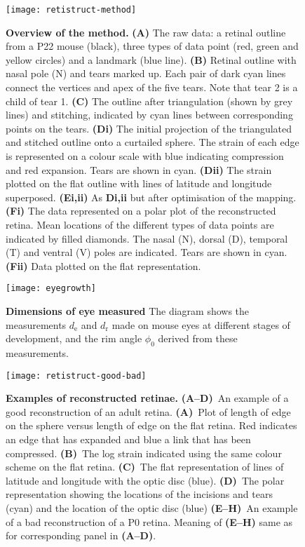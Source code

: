 \documentclass[10pt]{article}
\begin{document}
\begin{figure}[!ht]
  \texttt{[image: retistruct-method]}

  \caption{\textbf{Overview of the method.} \textbf{(A)} The raw data:
    a retinal outline from a P22 mouse (black), three types of data
    point (red, green and yellow circles) and a landmark (blue
    line). \textbf{(B)} Retinal outline with nasal pole (N) and tears
    marked up. Each pair of dark cyan lines connect the vertices and
    apex of the five tears. Note that tear 2 is a child of tear
    1. \textbf{(C)} The outline after triangulation (shown by grey
    lines) and stitching, indicated by cyan lines between
    corresponding points on the tears.  \textbf{(Di)} The initial
    projection of the triangulated and stitched outline onto a
    curtailed sphere. The strain of each edge is represented on a colour
    scale with blue indicating compression and red expansion. Tears
    are shown in cyan. \textbf{(Dii)} The strain plotted on the flat
    outline with lines of latitude and longitude
    superposed. \textbf{(Ei,ii)} As \textbf{Di,ii} but after
    optimisation of the mapping. \textbf{(Fi)} The data represented on
    a polar plot of the reconstructed retina. Mean locations of the
    different types of data points are indicated by filled
    diamonds. The nasal (N), dorsal (D), temporal (T) and ventral (V)
    poles are indicated. Tears are shown in cyan. \textbf{(Fii)} Data
    plotted on the flat representation.}
  \label{fold-sphere:fig:method}
\end{figure}
\begin{figure}[!ht]
  \centering
  \texttt{[image: eyegrowth]}
  \caption{\textbf{Dimensions of eye measured} The diagram shows the
    measurements $d_\mathrm{e}$ and $d_\mathrm{r}$ made on mouse eyes
    at different stages of development, and the rim angle $\phi_0$
    derived from these measurements.}
  \label{retistruct_plos:fig:eyegrowth}
\end{figure}
\begin{figure}[!ht]
  \centering
  \texttt{[image: retistruct-good-bad]}

  \caption{\textbf{Examples of reconstructed retinae.}
    \textbf{(A--D)}~An example of a good reconstruction of an adult
    retina.  \textbf{(A)}~Plot of length of edge on the sphere versus
    length of edge on the flat retina. Red indicates an edge that has
    expanded and blue a link that has been compressed.
    \textbf{(B)}~The log strain indicated using the same colour scheme
    on the flat retina. \textbf{(C)}~The flat representation of lines
    of latitude and longitude with the optic disc
    (blue). \textbf{(D)}~The polar representation showing the
    locations of the incisions and tears (cyan) and the location of
    the optic disc (blue) \textbf{(E--H)}~An example of a bad
    reconstruction of a P0 retina. Meaning of \textbf{(E--H)} same as
    for corresponding panel in \textbf{(A--D)}.}
  \label{retistruct_plos:fig:examples}
\end{figure}
\end{document}

